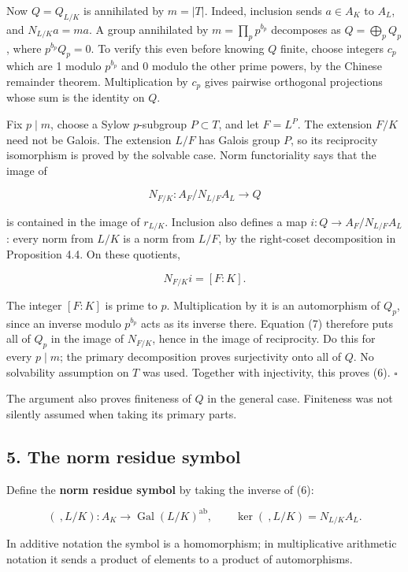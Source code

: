 \documentclass[11pt,a4paper]{article}
\begin{document}
Now \(Q=Q_{L/K}\) is annihilated by \(m=|T|\). Indeed, inclusion sends
\(a\in A_K\) to \(A_L\), and \(N_{L/K}a=ma\). A group annihilated by
\(m=\prod_p p^{b_p}\) decomposes as \(Q=\bigoplus_p Q_p\), where
\(p^{b_p}Q_p=0\). To verify this even before knowing \(Q\) finite,
choose integers \(c_p\) which are 1 modulo \(p^{b_p}\) and 0 modulo the
other prime powers, by the Chinese remainder theorem. Multiplication by
\(c_p\) gives pairwise orthogonal projections whose sum is the identity
on \(Q\).

Fix \(p\mid m\), choose a Sylow \(p\)-subgroup \(P\subset T\), and let
\(F=L^P\). The extension \(F/K\) need not be Galois. The extension
\(L/F\) has Galois group \(P\), so its reciprocity isomorphism is proved
by the solvable case. Norm functoriality says that the image of

\[
N_{F/K}:A_F/N_{L/F}A_L\longrightarrow Q
\]

is contained in the image of \(r_{L/K}\). Inclusion also defines a map
\(i:Q\to A_F/N_{L/F}A_L\): every norm from \(L/K\) is a norm from
\(L/F\), by the right-coset decomposition in Proposition 4.4. On these
quotients,

\[
N_{F/K}i=[F:K].
\tag{7}
\]

The integer \([F:K]\) is prime to \(p\). Multiplication by it is an
automorphism of \(Q_p\), since an inverse modulo \(p^{b_p}\) acts as its
inverse there. Equation (7) therefore puts all of \(Q_p\) in the image
of \(N_{F/K}\), hence in the image of reciprocity. Do this for every
\(p\mid m\); the primary decomposition proves surjectivity onto all of
\(Q\). No solvability assumption on \(T\) was used. Together with
injectivity, this proves (6). \(\square\)

The argument also proves finiteness of \(Q\) in the general case.
Finiteness was not silently assumed when taking its primary parts.

\subsection{5. The norm residue symbol}\label{the-norm-residue-symbol}

Define the \textbf{norm residue symbol} by taking the inverse of (6):

\[
(\ ,L/K):A_K\longrightarrow\operatorname{Gal}(L/K)^{\mathrm{ab}},
\qquad \ker(\ ,L/K)=N_{L/K}A_L.
\tag{8}
\]

In additive notation the symbol is a homomorphism; in multiplicative
arithmetic notation it sends a product of elements to a product of
automorphisms.
\end{document}

